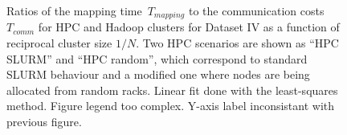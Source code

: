 \documentclass[11pt, oneside]{article}   	%
\newcommand{\COMMENT}[1]{{\color{red} #1 }}
\begin{document}
\begin{figure}
	\small
	
	\normalsize
	\caption{Ratios of the mapping time~$T_{mapping}$ to the communication costs~$T_{comm}$ for HPC and Hadoop clusters for Dataset IV as a function of reciprocal cluster size $1/N$. Two HPC scenarios are shown as ``HPC SLURM'' and ``HPC random'', which correspond to standard SLURM behaviour and a modified one where nodes are being allocated from random racks.
Linear fit  done with the least-squares method. \COMMENT{Figure legend too complex. Y-axis label inconsistant with previous figure.}}
	\label{fig:fig3}
\end{figure}
\end{document}
